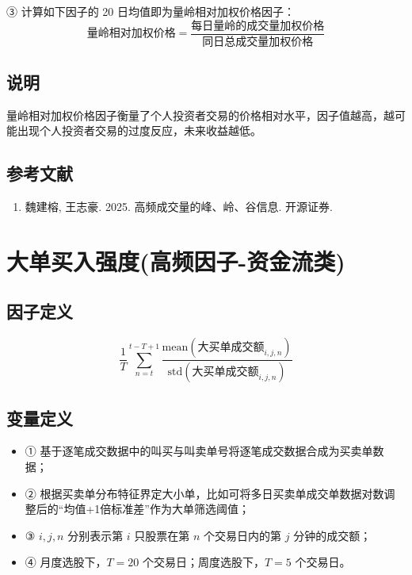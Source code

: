 \documentclass{article}
\begin{document}
③ 计算如下因子的 20 日均值即为量岭相对加权价格因子：
\begin{equation}
    \text{量岭相对加权价格} = \frac{\text{每日量岭的成交量加权价格}}{\text{同日总成交量加权价格}}
\end{equation}

\subsection{说明}
量岭相对加权价格因子衡量了个人投资者交易的价格相对水平，因子值越高，越可能出现个人投资者交易的过度反应，未来收益越低。

\subsection{参考文献}
\begin{enumerate}
    \item 魏建榕, 王志豪. 2025. 高频成交量的峰、岭、谷信息. 开源证券.
\end{enumerate}

\section{大单买入强度(高频因子-资金流类)}

\subsection{因子定义}

\begin{equation}
    \frac{1}{T} \sum_{n=t}^{t-T+1} \frac{\mathrm{mean}(\text{大买单成交额}_{i,j,n})}{\mathrm{std}(\text{大买单成交额}_{i,j,n})}
\end{equation}

\subsection{变量定义}
\begin{itemize}
    \item ① 基于逐笔成交数据中的叫买与叫卖单号将逐笔成交数据合成为买卖单数据；
    \item ② 根据买卖单分布特征界定大小单，比如可将多日买卖单成交单数据对数调整后的“均值+1倍标准差”作为大单筛选阈值；
    \item ③ \( i, j, n \) 分别表示第 \( i \) 只股票在第 \( n \) 个交易日内的第 \( j \) 分钟的成交额；
    \item ④ 月度选股下，\( T = 20 \) 个交易日；周度选股下，\( T = 5 \) 个交易日。
\end{itemize}
\end{document}
